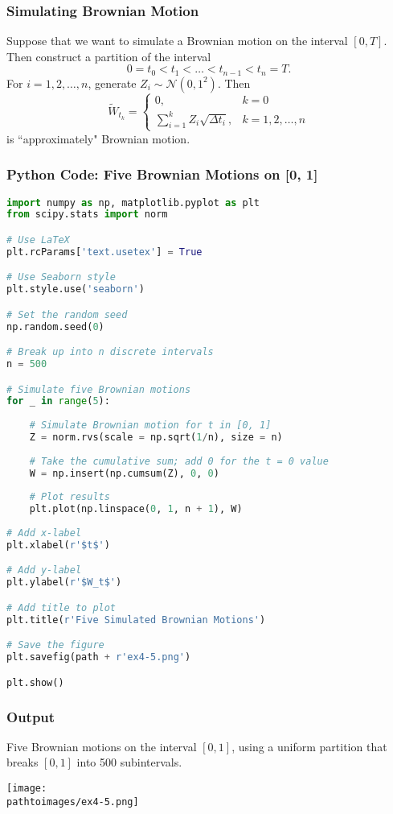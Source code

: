 \documentclass{beamer}
\newcommand{\pathtoimages}{/Users/charlesrambo/Desktop/Bootcamp24/Images}
\begin{document}
\begin{frame}
\frametitle{Simulating Brownian Motion}
Suppose that we want to simulate a Brownian motion on the interval $[0, T]$. Then construct a partition of the interval
$$
0 = t_0 < t_1 <\ldots < t_{n - 1} < t_n = T.
$$
For $i = 1, 2,\ldots, n$, generate $Z_i\sim{\mathcal{N}(0, 1^2)}$. Then 
$$
\widetilde{W}_{t_k} = \begin{cases} 0	,	&	k = 0\\
						\sum_{i = 1}^k Z_i \sqrt{\Delta t_i},	&	k = 1, 2,\ldots, n
						\end{cases}
$$
is ``approximately" Brownian motion.
\end{frame}

\begin{frame}[fragile]
\frametitle{Python Code: Five Brownian Motions on [0, 1]}

\begin{multicols}{2}
\begin{lstlisting}[language=Python]
import numpy as np, matplotlib.pyplot as plt
from scipy.stats import norm

# Use LaTeX
plt.rcParams['text.usetex'] = True

# Use Seaborn style
plt.style.use('seaborn')

# Set the random seed
np.random.seed(0)

# Break up into n discrete intervals
n = 500

# Simulate five Brownian motions
for _ in range(5):
    
    # Simulate Brownian motion for t in [0, 1]
    Z = norm.rvs(scale = np.sqrt(1/n), size = n)
    
    # Take the cumulative sum; add 0 for the t = 0 value
    W = np.insert(np.cumsum(Z), 0, 0)
    
    # Plot results
    plt.plot(np.linspace(0, 1, n + 1), W)
    
# Add x-label
plt.xlabel(r'$t$')

# Add y-label
plt.ylabel(r'$W_t$')

# Add title to plot
plt.title(r'Five Simulated Brownian Motions')

# Save the figure
plt.savefig(path + r'ex4-5.png')

plt.show()
\end{lstlisting}
\end{multicols}
\end{frame}

\begin{frame}
\frametitle{Output}
Five Brownian motions on the interval $[0, 1]$, using a uniform partition that breaks $[0, 1]$ into 500 subintervals. 
\begin{center}
\texttt{[image: \\pathtoimages/ex4-5.png]}
\end{center}

\end{frame}
\end{document}
